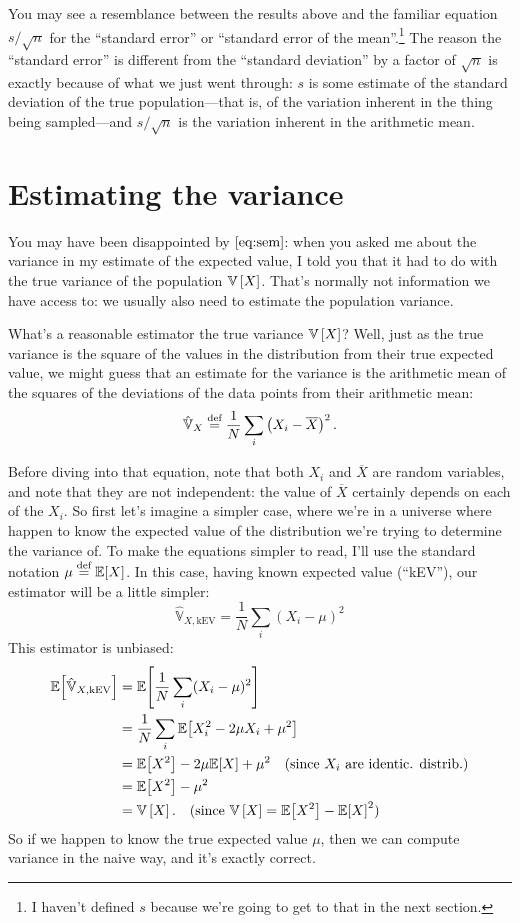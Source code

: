 You may see a resemblance between the results above and the familiar equation
$s/\sqrt{n}$ for the ``standard error'' or ``standard error of the
mean''.\footnote{I haven't defined $s$ because we're going to get to that in
the next section.} The reason the ``standard error'' is different from the
``standard deviation'' by a factor of $\sqrt{n}$ is exactly because of what we
just went through: $s$ is some estimate of the standard deviation of the true
population---that is, of the variation inherent in the thing being
sampled---and $s/\sqrt{n}$ is the variation inherent in the arithmetic mean.

\section{Estimating the variance}

You may have been disappointed by $\eqref{eq:sem}$: when you asked me about
the variance in my estimate of the expected value, I told you that it had to
do with the true variance of the population $\mathbb{V}\left[{X}\right]$. That's normally not
information we have access to: we usually also need to estimate the population
variance.

What's a reasonable estimator the true variance $\mathbb{V}\left[{X}\right]$? Well, just as the
true variance is the square of the values in the distribution from their true
expected value, we might guess that an estimate for the variance is the
arithmetic mean of the squares of the deviations of the data points from their
arithmetic mean:
\begin{equation}\label{eq:estimator-vx1}
\hat{\mathbb{V}}_X \stackrel{\text{def}}{=} \frac{1}{N} \sum_i \left( X_i - \overline{X} \right)^2.
\end{equation}

Before diving into that equation, note that both $X_i$ and $\overline{X}$ are
random variables, and note that they are not independent: the value of
$\overline{X}$ certainly depends on each of the $X_i$. So first let's imagine
a simpler case, where we're in a universe where happen to know the expected
value of the distribution we're trying to determine the variance of. To make
the equations simpler to read, I'll use the standard notation $\mu \stackrel{\text{def}}{=}
\mathbb{E}\!\left[{X}\right]$. In this case, having known expected value (``kEV''), our
estimator will be a little simpler:
\begin{equation}
\hat{\mathbb{V}}_{X,\mathrm{kEV}} = \frac{1}{N} \sum_i ( X_i - \mu )^2
\end{equation}
This estimator is unbiased:
\begin{align*}
\expect{\hat{\mathbb{V}}_{X,\mathrm{kEV}}}
  &= \expect{\frac{1}{N} \sum_i ( X_i - \mu )^2} \\
  &= \frac{1}{N} \sum_i \expect{X_i^2 - 2\mu X_i + \mu^2} \\
  &= \expect{X^2} - 2 \mu \expect{X} + \mu^2 \quad\text{(since $X_i$ are identic. distrib.)} \\
  &= \expect{X^2} - \mu^2 \\
  &= \var{X}. \quad\text{(since $\var{X} = \expect{X^2} - \expect{X}^2$)}
\end{align*}
So if we happen to know the true expected value $\mu$, then we can compute
variance in the naive way, and it's exactly correct.

